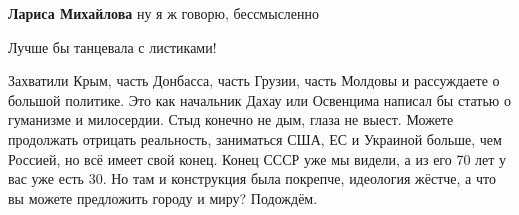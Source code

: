 \begin{itemize}
\begin{itemize}
\textbf{Лариса Михайлова} ну я ж говорю, бессмысленно
\end{itemize} %

Лучше бы танцевала с листиками!


Захватили Крым, часть Донбасса, часть Грузии, часть Молдовы и рассуждаете о
большой политике. Это как начальник Дахау или Освенцима написал бы статью о
гуманизме и милосердии. Стыд конечно не дым, глаза не выест. Можете продолжать
отрицать реальность, заниматься США, ЕС и Украиной больше, чем Россией, но всё
имеет свой конец. Конец СССР уже мы видели, а из его 70 лет у вас уже есть 30.
Но там и конструкция была покрепче, идеология жёстче, а что вы можете
предложить городу и миру? Подождём.

\end{itemize} %
